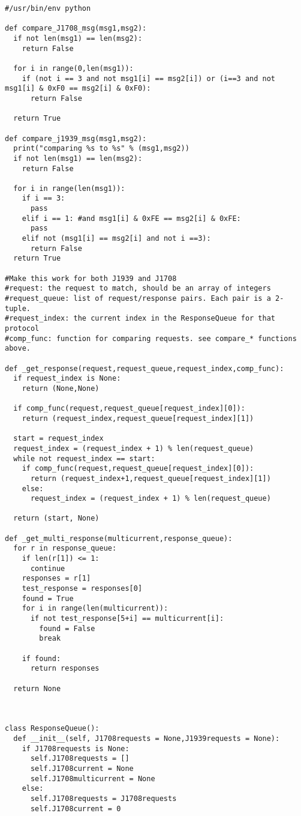 \begin{verbatim}
#/usr/bin/env python

def compare_J1708_msg(msg1,msg2):
  if not len(msg1) == len(msg2):
    return False
  
  for i in range(0,len(msg1)):
    if (not i == 3 and not msg1[i] == msg2[i]) or (i==3 and not msg1[i] & 0xF0 == msg2[i] & 0xF0):
      return False
  
  return True

def compare_j1939_msg(msg1,msg2):
  print("comparing %s to %s" % (msg1,msg2))
  if not len(msg1) == len(msg2):
    return False

  for i in range(len(msg1)):
    if i == 3:
      pass
    elif i == 1: #and msg1[i] & 0xFE == msg2[i] & 0xFE:
      pass
    elif not (msg1[i] == msg2[i] and not i ==3):
      return False
  return True

#Make this work for both J1939 and J1708
#request: the request to match, should be an array of integers
#request_queue: list of request/response pairs. Each pair is a 2-tuple.
#request_index: the current index in the ResponseQueue for that protocol
#comp_func: function for comparing requests. see compare_* functions above.

def _get_response(request,request_queue,request_index,comp_func):
  if request_index is None:
    return (None,None)

  if comp_func(request,request_queue[request_index][0]):
    return (request_index,request_queue[request_index][1])

  start = request_index
  request_index = (request_index + 1) % len(request_queue)
  while not request_index == start:
    if comp_func(request,request_queue[request_index][0]):
      return (request_index+1,request_queue[request_index][1])
    else:
      request_index = (request_index + 1) % len(request_queue)

  return (start, None)

def _get_multi_response(multicurrent,response_queue):
  for r in response_queue:
    if len(r[1]) <= 1:
      continue
    responses = r[1]
    test_response = responses[0]
    found = True
    for i in range(len(multicurrent)):
      if not test_response[5+i] == multicurrent[i]:
        found = False
        break

    if found:
      return responses

  return None


  
class ResponseQueue():
  def __init__(self, J1708requests = None,J1939requests = None):
    if J1708requests is None:
      self.J1708requests = []
      self.J1708current = None
      self.J1708multicurrent = None
    else:
      self.J1708requests = J1708requests
      self.J1708current = 0


\end{verbatim}
